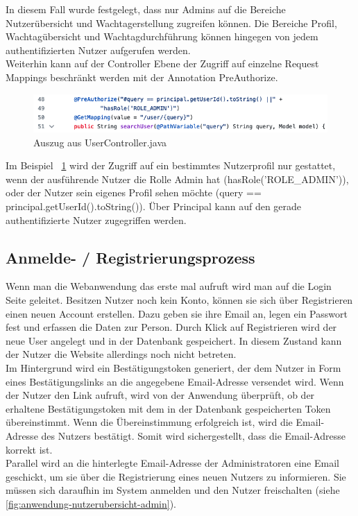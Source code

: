 \documentclass[fontsize=12pt,openright,oneside,paper=a4,BCOR=1cm]{scrbook}
\begin{document}
In diesem Fall wurde festgelegt, dass nur Admins auf die Bereiche \glqq Nutzer\"ubersicht\grqq{} und \glqq Wachtagerstellung\grqq{} zugreifen k\"onnen. Die Bereiche \glqq Profil\grqq{}, \glqq Wachtag\"ubersicht\grqq{} und \glqq Wachtagdurchf\"uhrung\grqq{} k\"onnen hingegen von jedem authentifizierten Nutzer aufgerufen werden. \\
Weiterhin kann auf der Controller Ebene der Zugriff auf einzelne Request Mappings beschr\"ankt werden mit der Annotation \glqq PreAuthorize\grqq{}. 
\begin{figure}[H]
  \centering
    \includegraphics[width=0.7\linewidth]{Anlagen/Code/UserController.png}
    \caption{Auszug aus UserController.java}
  \label{fig:userController}
\end{figure}

Im Beispiel ~\ref{fig:userController} wird der Zugriff auf ein bestimmtes Nutzerprofil nur gestattet, wenn der ausf\"uhrende Nutzer die Rolle Admin hat (\glqq hasRole('ROLE\_ADMIN')\grqq{}), oder der Nutzer sein eigenes Profil sehen m\"ochte (\glqq query == principal.getUserId().toString()\grqq{}). \"Uber Principal kann auf den gerade authentifizierte Nutzer zugegriffen werden.

\subsection{Anmelde- / Registrierungsprozess}

Wenn man die Webanwendung das erste mal aufruft wird man auf die Login Seite geleitet. Besitzen Nutzer noch kein Konto, können sie sich über Registrieren einen neuen Account erstellen. Dazu geben sie ihre Email an, legen ein Passwort fest und erfassen die Daten zur Person. Durch Klick auf \glqq Registrieren\grqq{} wird der neue User angelegt und in der Datenbank gespeichert. In diesem Zustand kann der Nutzer die Website allerdings noch nicht betreten. \\
Im Hintergrund wird ein Bestätigungstoken generiert, der dem Nutzer in Form eines Bestätigungslinks an die angegebene Email-Adresse versendet wird. Wenn der Nutzer den Link aufruft, wird von der Anwendung überprüft, ob der erhaltene Bestätigungstoken mit dem in der Datenbank gespeicherten Token übereinstimmt. Wenn die Übereinstimmung erfolgreich ist, wird die Email-Adresse des Nutzers bestätigt. Somit wird sichergestellt, dass die Email-Adresse korrekt ist. \\
Parallel wird an die hinterlegte Email-Adresse der Administratoren eine Email geschickt, um sie über die Registrierung eines neuen Nutzers zu informieren. Sie müssen sich daraufhin im System anmelden und den Nutzer freischalten (siehe \ref{fig:anwendung-nutzerubersicht-admin}).
\end{document}
